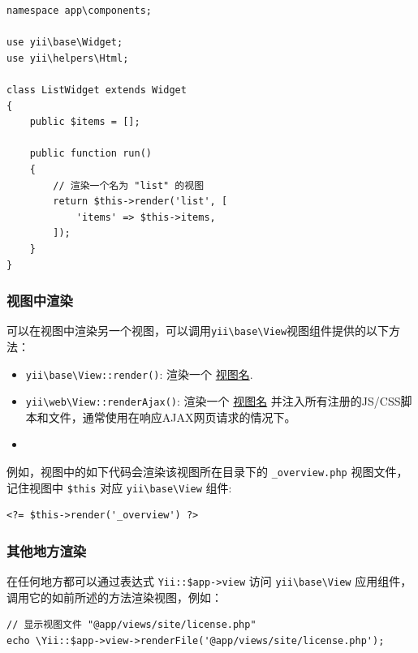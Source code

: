 \lstset{language=php}\begin{lstlisting}
namespace app\components;

use yii\base\Widget;
use yii\helpers\Html;

class ListWidget extends Widget
{
    public $items = [];

    public function run()
    {
        // 渲染一个名为 "list" 的视图
        return $this->render('list', [
            'items' => $this->items,
        ]);
    }
}
\end{lstlisting}
\subsubsection{视图中渲染 \label{structure-views.md::rendering-in-views}}
可以在视图中渲染另一个视图，可以调用\texttt{yii{\allowbreak{}\textbackslash}base{\allowbreak{}\textbackslash}View}视图组件提供的以下方法：

\begin{itemize}
\item \texttt{yii{\allowbreak{}\textbackslash}base{\allowbreak{}\textbackslash}View\allowbreak{}::\allowbreak{}render()}: 渲染一个 \hyperref[structure-views.md::::named-views]{视图名}.
\item \texttt{yii{\allowbreak{}\textbackslash}web{\allowbreak{}\textbackslash}View\allowbreak{}::\allowbreak{}renderAjax()}: 渲染一个 \hyperref[structure-views.md::::named-views]{视图名}
并注入所有注册的JS/CSS脚本和文件，通常使用在响应AJAX网页请求的情况下。
\item 
\end{itemize}
例如，视图中的如下代码会渲染该视图所在目录下的 \lstinline|_overview.php| 视图文件，
记住视图中 \lstinline|$this| 对应 \texttt{yii{\allowbreak{}\textbackslash}base{\allowbreak{}\textbackslash}View} 组件:

\lstset{language=php}\begin{lstlisting}
<?= $this->render('_overview') ?>
\end{lstlisting}
\subsubsection{其他地方渲染 \label{structure-views.md::rendering-in-other-places}}
在任何地方都可以通过表达式 \lstinline|Yii::$app->view| 访问 \texttt{yii{\allowbreak{}\textbackslash}base{\allowbreak{}\textbackslash}View} 应用组件，
调用它的如前所述的方法渲染视图，例如：

\lstset{language=php}\begin{lstlisting}
// 显示视图文件 "@app/views/site/license.php"
echo \Yii::$app->view->renderFile('@app/views/site/license.php');
\end{lstlisting}
